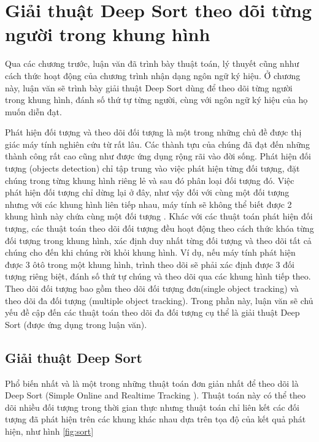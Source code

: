 \chapter{Giải thuật Deep Sort theo dõi từng người trong khung hình}
Qua các chương trước, luận văn đã trình bày thuật toán, lý thuyết cũng nhhư cách thức hoạt động của chương trình nhận dạng ngôn ngữ ký hiệu. Ở chương này, luận văn sẽ trình bày giải thuật Deep Sort dùng để theo dõi từng người trong khung hình, đánh số thứ tự từng người, cùng với ngôn ngữ ký hiệu của họ muốn diễn đạt.

Phát hiện đối tượng và theo dõi đối tượng là một trong những chủ đề được thị giác máy tính nghiên cứu từ rất lâu. Các thành tựu của chúng đã đạt đến những thành công rất cao cũng như được ứng dụng rộng rãi vào đời sống. Phát hiện đối tượng (objects detection) chỉ tập trung vào việc phát hiện từng đối tượng, đặt chúng trong từng khung hình riêng lẻ và sau đó phân loại đối tượng đó. Việc phát hiện đối tượng chỉ dừng lại ở đây, như vậy đối với cùng một đối tượng nhưng với các khung hình liên tiếp nhau, máy tính sẽ không thể biết được 2 khung hình này chứa cùng một đối tượng . Khác với các thuật toán phát hiện đối tượng, các thuật toán theo dõi đối tượng đều hoạt động theo cách thức khóa từng đối tượng trong khung hình, xác định duy nhất từng đối tượng và theo dõi tất cả chúng cho đến khi chúng rời khỏi khung hình. Ví dụ, nếu máy tính phát hiện được 3 ôtô trong một khung hình, trình theo dõi sẽ phải xác định được 3 đối tượng riêng biệt, đánh số thứ tự chúng và theo dõi qua các khung hình tiếp theo. Theo dõi đối tượng bao gồm theo dõi đối tượng đơn(single object tracking) và theo dõi đa đối tượng (multiple object tracking). Trong phần này, luận văn sẽ chủ yếu đề cập đến các thuật toán theo dõi đa đối tượng cụ thể là giải thuật Deep Sort (được ứng dụng trong luận văn).  
 

\section{Giải thuật Deep Sort}

Phổ biến nhất và là một trong những thuật toán đơn giản nhất để theo dõi là Deep Sort (Simple Online and Realtime Tracking \cite{bewley2016simple}). Thuật toán này có thể theo dõi nhiều đối tượng trong thời gian thực nhưng thuật toán chỉ liên kết các đối tượng đã phát hiện trên các khung khác nhau dựa trên tọa độ của kết quả phát hiện, như hình \ref{fig:sort}

